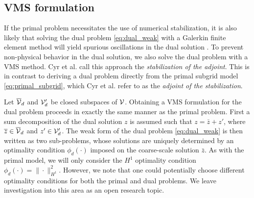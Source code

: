 \subsection{VMS formulation}

If the primal problem necessitates the use of numerical
stabilization, it is also likely that solving the dual problem
\eqref{eq:dual_weak} with a Galerkin finite element method will
yield spurious oscillations in the dual solution
\cite{cyr2014approaches}. To prevent non-physical behavior
in the dual solution, we also solve the dual problem with a VMS
method. Cyr et al. \cite{cyr2014approaches} call this
approach the \emph{stabilization of the adjoint}. This is in
contrast to deriving a dual problem directly from the primal
subgrid model \eqref{eq:primal_subgrid}, which Cyr et al.
refer to as the \emph{adjoint of the stabilization}.

Let $\overline{\mathcal{V}}_d$ and $\mathcal{V}'_d$ be closed subspaces of $\mathcal{V}$.
Obtaining a VMS formulation for the dual problem proceeds
in exactly the same manner as the primal problem. First
a sum decomposition of the dual solution $z$ is assumed
such that $z = \bar{z} + z'$, where $\overline{z} \in \overline{\mathcal{V}}_d$
and $z' \in \mathcal{V}'_d$. The weak form of the dual problem
\eqref{eq:dual_weak} is then written as two sub-problems,
whose solutions are uniquely determined by an optimality
condition $\phi_d(\cdot)$ imposed on the coarse-scale
solution $\bar{z}$. As with the primal model, we will only
consider the $H^1$ optimality condition
$\phi_d(\cdot) = \| \cdot \|^2_{H^1}$. However, we note
that one could potentially choose different optimality
conditions for both the primal and dual problems. We leave
investigation into this area as an open research topic.


